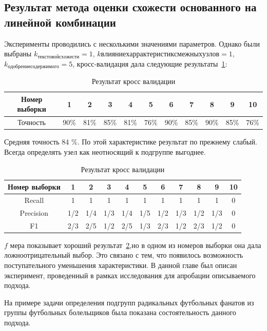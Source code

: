 \documentclass[annotation,times,page4]{itmo-student-thesis}
\begin{document}
\subsection{Результат метода оценки схожести основанного на линейной комбинации}
Эксперименты проводились с несколькими значениями параметров. Однако были выбраны $k_{текстовой схожести} = 1$, $k{влияние харрактеристик смежных узлов}=1$, $k_{одобрение содержимого}=5$,  
кросс-валидация дала следующие результаты~\ref{tab1}:
\begin{table}[!h]
\caption{Результат кросс валидации}\label{tab1}
\centering
\begin{tabular}{|*{11}{c|}}\hline
Номер выборки & 1 & 2 & 3 & 4 & 5 & 6 & 7 & 8 & 9 & 10 \\\hline
Точность  & 90\% & 81\% & 85\% & 81\% & 76\% & 90\% & 85\% & 90\% & 85\% & 76\% \\\hline
\end{tabular}
\end{table}

Средняя точность 84 \%. По этой характеристике результат по прежнему слабый. Всегда определять узел как неотносящий к подгруппе выгоднее.

\begin{table}[!h]
\caption{Результат кросс валидации}\label{tab4}
\centering
\begin{tabular}{|*{11}{c|}}\hline
Номер выборки & 1 & 2 & 3 & 4 & 5 & 6 & 7 & 8 & 9 & 10 \\\hline
Recall  & 1& 1& 1& 1& 1& 1& 1& 1& 1& 0\\\hline
Precision & 1/2 & 1/4 & 1/3 & 1/4 & 1/5 & 1/2 & 1/3 & 1/2 & 1/3 & 0\\\hline
F1        & 2/3 & 2/5 & 1/2 & 2/5 & 1/3 & 2/3 & 1/2 & 2/3 & 1/2 & 0 \\\hline

\end{tabular}
\end{table}

$f$ мера показывает хороший результат~\ref{tab4},но в одном из номеров выборки она дала ложноотрицательный выбор. Это связано с тем, что появилось возможность поступательного уменьшения характеристики.
\chapterconclusion
В данной главе был описан эксперимент, проведенный в рамках исследования для апробации описываемого подхода.

На примере задачи определения подгрупп радикальных футбольных фанатов из группы футбольных болельщиков была показана состоятельность данного подхода. 
\end{document}
